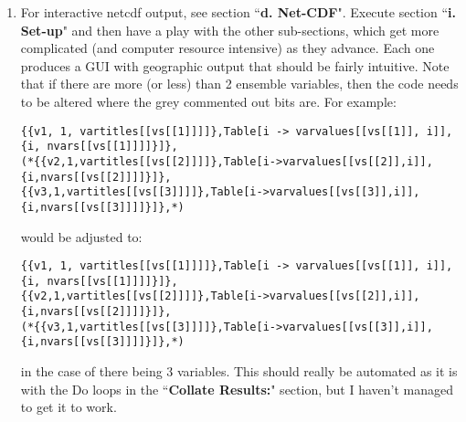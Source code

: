 \documentclass[10pt,a4paper, onecolumn]{article}
\begin{document}
\begin{enumerate}
\item For interactive netcdf output, see section ``\textbf{d. Net-CDF}". Execute section ``\textbf{i. Set-up}" and then have a play with the other sub-sections, which get more complicated (and computer resource intensive) as they advance. Each one produces a GUI with geographic output that should be fairly intuitive. Note that if there are more (or less) than 2 ensemble variables, then the code needs to be altered where the grey commented out bits are. For example:

\texttt{\{\{v1, 1, vartitles[[vs[[1]]]]\},Table[i -> varvalues[[vs[[1]], i]], \{i, nvars[[vs[[1]]]]\}]\}, \\
(*\{\{v2,1,vartitles[[vs[[2]]]]\},Table[i->varvalues[[vs[[2]],i]],\{i,nvars[[vs[[2]]]]\}]\}, \\
\{\{v3,1,vartitles[[vs[[3]]]]\},Table[i->varvalues[[vs[[3]],i]],\{i,nvars[[vs[[3]]]]\}]\},*)}

would be adjusted to:

\texttt{\{\{v1, 1, vartitles[[vs[[1]]]]\},Table[i -> varvalues[[vs[[1]], i]], \{i, nvars[[vs[[1]]]]\}]\}, \\
\{\{v2,1,vartitles[[vs[[2]]]]\},Table[i->varvalues[[vs[[2]],i]],\{i,nvars[[vs[[2]]]]\}]\}, \\
(*\{\{v3,1,vartitles[[vs[[3]]]]\},Table[i->varvalues[[vs[[3]],i]],\{i,nvars[[vs[[3]]]]\}]\},*)}

in the case of there being 3 variables. This should really be automated as it is with the Do loops in the ``\textbf{Collate Results:}" section, but I haven't managed to get it to work.

\end{enumerate}
\end{document}
